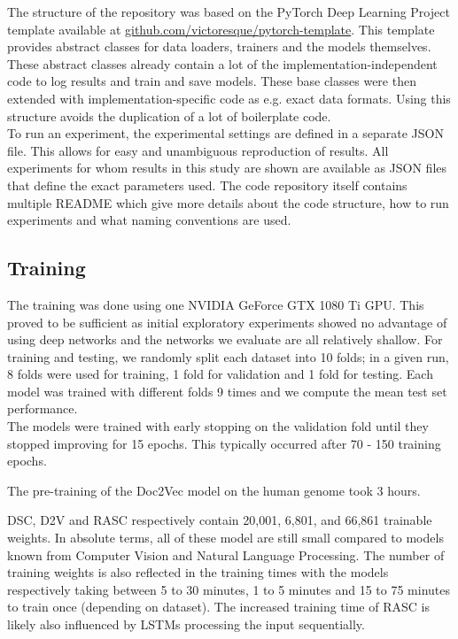 The structure of the repository was based on the PyTorch Deep Learning Project template available at \url{github.com/victoresque/pytorch-template}. This template provides abstract classes for data loaders, trainers and the models themselves. These abstract classes already contain a lot of the implementation-independent code to log results and train and save models. These base classes were then extended with implementation-specific code as e.g. exact data formats. Using this structure avoids the duplication of a lot of boilerplate code.\\
To run an experiment, the experimental settings are defined in a separate JSON file. This allows for easy and unambiguous reproduction of results. All experiments for whom results in this study are shown are available as JSON files that define the exact parameters used.
The code repository itself contains multiple README which give more details about the code structure, how to run experiments and what naming conventions are used. 


\subsection{Training} \label{subsec:training_details}
The training was done using one NVIDIA GeForce GTX 1080 Ti GPU. This proved to be sufficient as initial exploratory experiments showed no advantage of using deep networks and the networks we evaluate are all relatively shallow. For training and testing, we randomly split each dataset into 10 folds; in a given run, 8 folds were used for training, 1 fold for validation and 1 fold for testing. Each model was trained with different folds 9 times and we compute the mean test set performance.\\
The models were trained with early stopping on the validation fold until they stopped improving for 15 epochs. This typically occurred after 70 - 150 training epochs.

The pre-training of the Doc2Vec model on the human genome took 3 hours. 

DSC, D2V and RASC respectively contain 20,001, 6,801, and 66,861 trainable weights. In absolute terms, all of these model are still small compared to models known from Computer Vision and Natural Language Processing. The number of training weights is also reflected in the training times with the models respectively taking between 5 to 30 minutes, 1 to 5 minutes and 15 to 75 minutes to train once (depending on dataset). The increased training time of RASC is likely also influenced by LSTMs processing the input sequentially.


